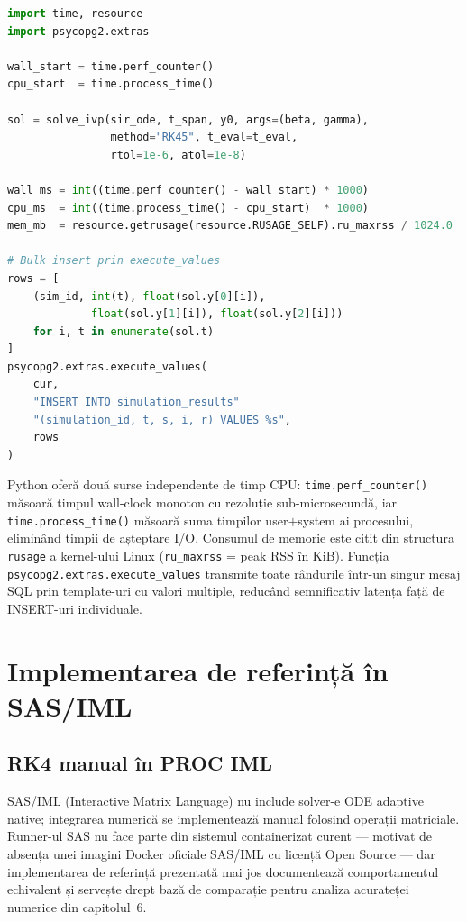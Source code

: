 \begin{lstlisting}[language=Python, caption={Benchmarking și inserare bulk în Python.}]
import time, resource
import psycopg2.extras

wall_start = time.perf_counter()
cpu_start  = time.process_time()

sol = solve_ivp(sir_ode, t_span, y0, args=(beta, gamma),
                method="RK45", t_eval=t_eval,
                rtol=1e-6, atol=1e-8)

wall_ms = int((time.perf_counter() - wall_start) * 1000)
cpu_ms  = int((time.process_time() - cpu_start)  * 1000)
mem_mb  = resource.getrusage(resource.RUSAGE_SELF).ru_maxrss / 1024.0

# Bulk insert prin execute_values
rows = [
    (sim_id, int(t), float(sol.y[0][i]),
             float(sol.y[1][i]), float(sol.y[2][i]))
    for i, t in enumerate(sol.t)
]
psycopg2.extras.execute_values(
    cur,
    "INSERT INTO simulation_results"
    "(simulation_id, t, s, i, r) VALUES %s",
    rows
)
\end{lstlisting}

Python oferă două surse independente de timp CPU: \texttt{time.perf\_counter()}
măsoară timpul wall-clock monoton cu rezoluție sub-microsecundă, iar
\texttt{time.process\_time()} măsoară suma timpilor user$+$system ai
procesului, eliminând timpii de așteptare I/O. Consumul de memorie este
citit din structura \texttt{rusage} a kernel-ului Linux
(\texttt{ru\_maxrss} = peak RSS în KiB). Funcția
\texttt{psycopg2.extras.execute\_values} transmite toate rândurile într-un
singur mesaj SQL prin template-uri cu valori multiple, reducând semnificativ
latența față de INSERT-uri individuale.

\section{Implementarea de referință în SAS/IML}
\label{sec:implementare_sas}

\subsection{RK4 manual în PROC IML}
\label{subsec:sas_iml}

SAS/IML (Interactive Matrix Language) \cite{sas_iml} nu include solver-e
ODE adaptive native; integrarea numerică se implementează manual folosind
operații matriciale. Runner-ul SAS nu face parte din sistemul containerizat
curent --- motivat de absența unei imagini Docker oficiale SAS/IML cu licență
Open Source --- dar implementarea de referință prezentată mai jos
documentează comportamentul echivalent și servește drept bază de comparație
pentru analiza acurateței numerice din capitolul~6.

